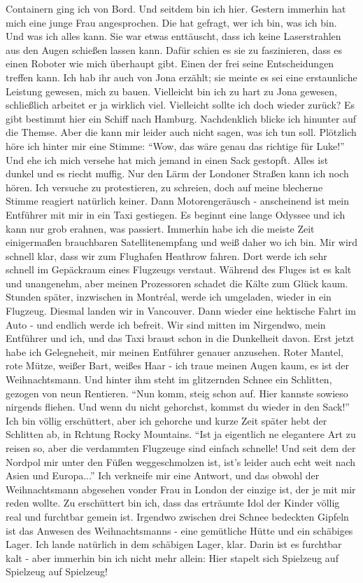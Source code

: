 Containern ging ich von Bord. Und seitdem bin ich hier. Gestern immerhin hat mich eine junge Frau angesprochen. Die hat gefragt, wer ich bin, was ich bin. Und was ich alles kann. Sie war etwas enttäuscht, dass ich keine Laserstrahlen aus den Augen schießen lassen kann. Dafür schien es sie zu faszinieren, dass es einen Roboter wie mich überhaupt gibt. Einen der frei seine Entscheidungen treffen kann. Ich hab ihr auch von Jona erzählt; sie meinte es sei eine erstaunliche Leistung gewesen, mich zu bauen. Vielleicht bin ich zu hart zu Jona gewesen, schließlich arbeitet er ja wirklich viel. Vielleicht sollte ich doch wieder zurück? Es gibt bestimmt hier ein Schiff nach Hamburg. Nachdenklich blicke ich hinunter auf die Themse. Aber die kann mir leider auch nicht sagen, was ich tun soll. Plötzlich höre ich hinter mir eine Stimme: "`Wow, das wäre genau das richtige für Luke!"' Und ehe ich mich versehe hat mich jemand in einen Sack gestopft. Alles ist dunkel und es riecht muffig. Nur den Lärm der Londoner Straßen kann ich noch hören. Ich versuche zu protestieren, zu schreien, doch auf meine blecherne Stimme reagiert natürlich keiner. Dann Motorengeräusch - anscheinend ist mein Entführer mit mir in ein Taxi gestiegen. Es beginnt eine lange Odyssee und ich kann nur grob erahnen, was passiert. Immerhin habe ich die meiste Zeit einigermaßen brauchbaren Satellitenempfang und weiß daher wo ich bin. Mir wird schnell klar, dass wir zum Flughafen Heathrow fahren. Dort werde ich sehr schnell im Gepäckraum eines Flugzeugs verstaut. Während des Fluges ist es kalt und unangenehm, aber meinen Prozessoren schadet die Kälte zum Glück kaum. Stunden später, inzwischen in Montréal, werde ich umgeladen, wieder in ein Flugzeug. Diesmal landen wir in Vancouver. Dann wieder eine hektische Fahrt im Auto - und endlich werde ich befreit. Wir sind mitten im Nirgendwo, mein Entführer und ich, und das Taxi braust schon in die Dunkelheit davon. Erst jetzt habe ich Gelegneheit, mir meinen Entführer genauer anzusehen. Roter Mantel, rote Mütze, weißer Bart, weißes Haar - ich traue meinen Augen kaum, es ist der Weihnachtsmann. Und hinter ihm steht im glitzernden Schnee ein Schlitten, gezogen von neun Rentieren. "`Nun komm, steig schon auf. Hier kannste sowieso nirgends fliehen. Und wenn du nicht gehorchst, kommst du wieder in den Sack!"' Ich bin völlig erschüttert, aber ich gehorche und kurze Zeit später hebt der Schlitten ab, in Rchtung Rocky Mountains. "`Ist ja eigentlich ne elegantere Art zu reisen so, aber die verdammten Flugzeuge sind einfach schnelle! Und seit dem der Nordpol mir unter den Füßen weggeschmolzen ist, ist's leider auch echt weit nach Asien und Europa..."' Ich verkneife mir eine Antwort, und das obwohl der Weihnachtsmann abgesehen vonder Frau in London der einzige ist, der je mit mir reden wollte. Zu erschüttert bin ich, dass das erträumte Idol der Kinder völlig real und furchtbar gemein ist. Irgendwo zwischen drei Schnee bedeckten Gipfeln ist das Anwesen des Weihnachtsmanns - eine gemütliche Hütte und ein schäbiges Lager. Ich lande natürlich in dem schäbigen Lager, klar. Darin ist es furchtbar kalt - aber immerhin bin ich nicht mehr allein: Hier stapelt sich Spielzeug auf Spielzeug auf Spielzeug!